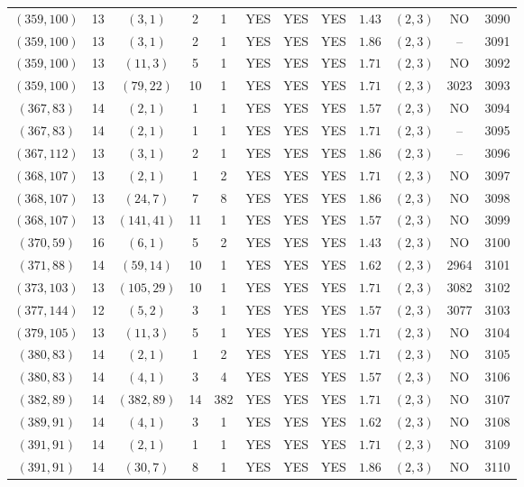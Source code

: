 \begin{longtable}{|c|c|c|c|c|c|c|c|c|c|c|c|}
$(359,100)$ & 13 & $(3,1)$ & 2 & 1 & YES & YES & YES & $1.43$ & $(2,3)$ & NO & 3090\\
$(359,100)$ & 13 & $(3,1)$ & 2 & 1 & YES & YES & YES & $1.86$ & $(2,3)$ & -- & 3091\\
$(359,100)$ & 13 & $(11,3)$ & 5 & 1 & YES & YES & YES & $1.71$ & $(2,3)$ & NO & 3092\\
$(359,100)$ & 13 & $(79,22)$ & 10 & 1 & YES & YES & YES & $1.71$ & $(2,3)$ & 3023 & 3093\\
$(367,83)$ & 14 & $(2,1)$ & 1 & 1 & YES & YES & YES & $1.57$ & $(2,3)$ & NO & 3094\\
$(367,83)$ & 14 & $(2,1)$ & 1 & 1 & YES & YES & YES & $1.71$ & $(2,3)$ & -- & 3095\\
$(367,112)$ & 13 & $(3,1)$ & 2 & 1 & YES & YES & YES & $1.86$ & $(2,3)$ & -- & 3096\\
$(368,107)$ & 13 & $(2,1)$ & 1 & 2 & YES & YES & YES & $1.71$ & $(2,3)$ & NO & 3097\\
$(368,107)$ & 13 & $(24,7)$ & 7 & 8 & YES & YES & YES & $1.86$ & $(2,3)$ & NO & 3098\\
$(368,107)$ & 13 & $(141,41)$ & 11 & 1 & YES & YES & YES & $1.57$ & $(2,3)$ & NO & 3099\\
$(370,59)$ & 16 & $(6,1)$ & 5 & 2 & YES & YES & YES & $1.43$ & $(2,3)$ & NO & 3100\\
$(371,88)$ & 14 & $(59,14)$ & 10 & 1 & YES & YES & YES & $1.62$ & $(2,3)$ & 2964 & 3101\\
$(373,103)$ & 13 & $(105,29)$ & 10 & 1 & YES & YES & YES & $1.71$ & $(2,3)$ & 3082 & 3102\\
$(377,144)$ & 12 & $(5,2)$ & 3 & 1 & YES & YES & YES & $1.57$ & $(2,3)$ & 3077 & 3103\\
$(379,105)$ & 13 & $(11,3)$ & 5 & 1 & YES & YES & YES & $1.71$ & $(2,3)$ & NO & 3104\\
$(380,83)$ & 14 & $(2,1)$ & 1 & 2 & YES & YES & YES & $1.71$ & $(2,3)$ & NO & 3105\\
$(380,83)$ & 14 & $(4,1)$ & 3 & 4 & YES & YES & YES & $1.57$ & $(2,3)$ & NO & 3106\\
$(382,89)$ & 14 & $(382,89)$ & 14 & 382 & YES & YES & YES & $1.71$ & $(2,3)$ & NO & 3107\\
$(389,91)$ & 14 & $(4,1)$ & 3 & 1 & YES & YES & YES & $1.62$ & $(2,3)$ & NO & 3108\\
$(391,91)$ & 14 & $(2,1)$ & 1 & 1 & YES & YES & YES & $1.71$ & $(2,3)$ & NO & 3109\\
$(391,91)$ & 14 & $(30,7)$ & 8 & 1 & YES & YES & YES & $1.86$ & $(2,3)$ & NO & 3110\\

\end{longtable}
